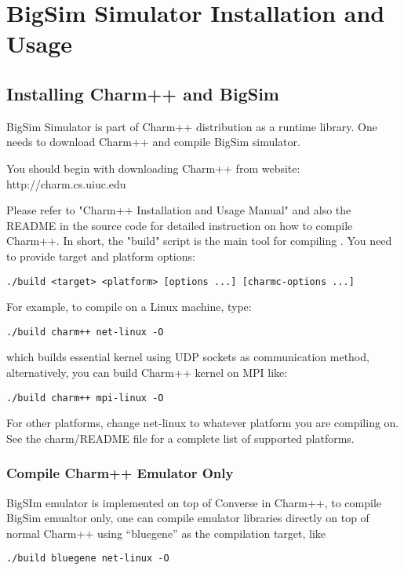 \section{BigSim Simulator Installation and Usage}
\label{install}

\subsection{Installing Charm++ and BigSim}

BigSim Simulator is part of Charm++ distribution as a runtime 
library. One needs to download Charm++ and compile BigSim simulator.

You should begin with downloading Charm++ from website:
http://charm.cs.uiuc.edu

Please refer to "Charm++ Installation and Usage Manual" and also the README
in the source code for detailed instruction on how to compile Charm++.
In short, the "build" script is the main tool for compiling \charmpp{}.
You need to provide target and platform options:
\begin{verbatim}
./build <target> <platform> [options ...] [charmc-options ...]
\end{verbatim}

For example, to compile on a Linux machine, type:
\begin{verbatim}
./build charm++ net-linux -O
\end{verbatim}

which builds essential \charmpp{} kernel using UDP sockets as 
communication method, 
alternatively, you can build Charm++ kernel on MPI like:
\begin{verbatim}
./build charm++ mpi-linux -O
\end{verbatim}

For other platforms, change net-linux to whatever platform you are compiling 
on. See the charm/README file for a complete list of supported platforms.

\subsubsection{Compile Charm++ Emulator Only}

BigSIm emulator is implemented on top of Converse in Charm++, 
to compile BigSim emualtor only, one can compile emulator libraries
directly on top of normal Charm++ using ``bluegene'' as the compilation
target, like
\begin{verbatim}
./build bluegene net-linux -O
\end{verbatim}

